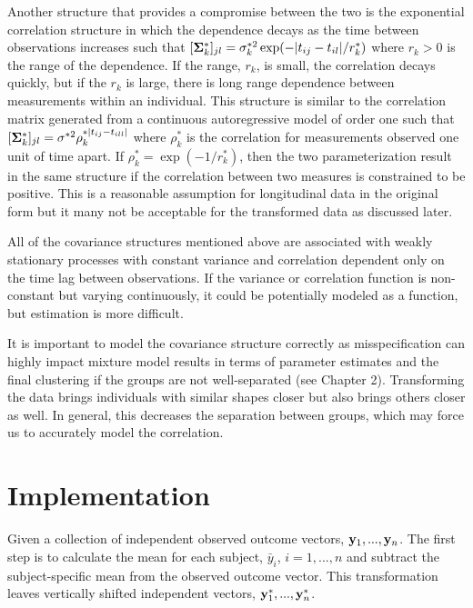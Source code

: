 Another structure that provides a compromise between the two is the exponential correlation structure in which the dependence decays as the time between observations increases such that $[\mathbf \Sigma^{*}_{k}]_{jl} = \sigma_{k}^{*2}\exp(-| t_{ij}-t_{il}| / r^{*}_{k})$ where $r_{k}> 0$ is the range of the dependence. If the range, $r_{k}$, is small, the correlation decays quickly, but if the $r_{k}$ is large, there is long range dependence between measurements within an individual. This structure is similar to the correlation matrix generated from a continuous autoregressive model of order one such that $[\mathbf\Sigma^{*}_{k}]_{jl} = \sigma^{*2}\rho_{k}^{*|t_{ij}-t_{ill}|}$ where $\rho^{*}_{k}$ is the correlation for measurements observed one unit of time apart. If $\rho^{*}_{k} = \exp(-1/r^{*}_{k})$, then the two parameterization result in the same structure if the correlation between two measures is constrained to be positive. This is a reasonable assumption for longitudinal data in the original form but it many not be acceptable for the transformed data as discussed later.

All of the covariance structures mentioned above are associated with weakly stationary processes with constant variance and correlation dependent only on the time lag between observations. If the variance or correlation function is non-constant but varying continuously, it could be potentially modeled as a function, but estimation is more difficult.

It is important to model the covariance structure correctly as misspecification can highly impact mixture model results in terms of parameter estimates and the final clustering if the groups are not well-separated (see Chapter 2). Transforming the data brings individuals with similar shapes closer but also brings others closer as well. In general, this decreases the separation between groups, which may force us to accurately model the correlation. 

\section{Implementation}
Given a collection of independent observed outcome vectors, $\mathbf y_{1},...,\mathbf y_{n}$. The first step is to calculate the mean for each subject, $\bar{y}_{i}$, $i=1,...,n$ and subtract the subject-specific mean from the observed outcome vector. This transformation leaves vertically shifted independent vectors, $\mathbf y^{*}_{1},...,\mathbf y^{*}_{n}$.  

